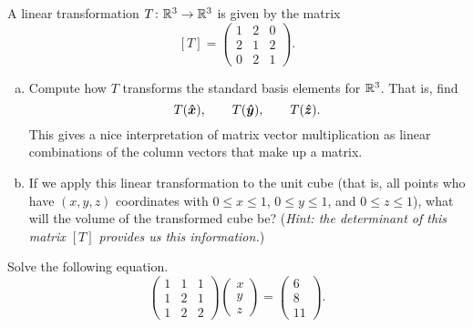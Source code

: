 \documentclass[12pt]{article} %
\begin{document}
\begin{problem}
A linear transformation $T\colon \mathbb{R}^3 \to \mathbb{R}^3$ is given by the matrix
\[
[T]= \begin{pmatrix}
1& 2& 0\\
2& 1& 2\\
0& 2& 1
\end{pmatrix}.
\]
\begin{enumerate}[(a)]
    \item Compute how $T$ transforms the standard basis elements for $\mathbb{R}^3$. That is, find
    \[
    T(\boldsymbol{\hat{x}}), \qquad
    T(\boldsymbol{\hat{y}}), \qquad 
    T(\boldsymbol{\hat{z}}).
    \]
    This gives a nice interpretation of matrix vector multiplication as linear combinations of the column vectors that make up a matrix.
    \item If we apply this linear transformation to the unit cube (that is, all points who have $(x,y,z)$ coordinates with $0\leq x \leq 1$, $0\leq y \leq 1$, and $0\leq z \leq 1$), what will the volume of the transformed cube be? (\emph{Hint: the determinant of this matrix $[T]$ provides us this information.})
\end{enumerate}
\end{problem}


\begin{problem}
Solve the following equation.
\[
\begin{pmatrix} 1 & 1 & 1 \\ 1 & 2 & 1 \\ 1 & 2 & 2 \end{pmatrix} \begin{pmatrix} x \\ y \\ z \end{pmatrix} = \begin{pmatrix} 6 \\ 8 \\ 11 \end{pmatrix}.
\]
\end{problem}
\end{document}
